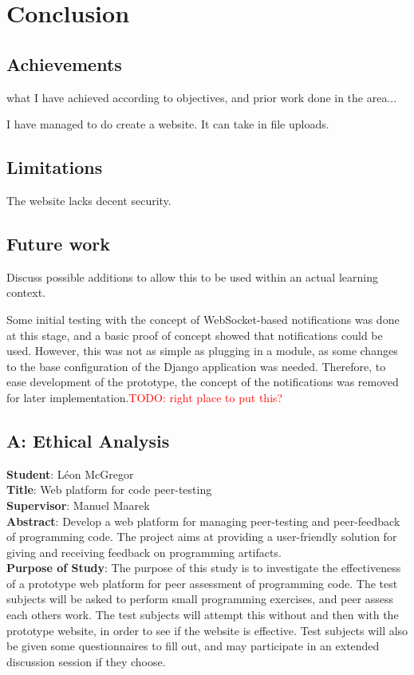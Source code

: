 \documentclass[a4paper,11pt]{report}
\newcommand{\todo}[1]{\textcolor{red}{TODO: #1}}
\begin{document}
\chapter{Conclusion}
\section{Achievements}
what I have achieved according to objectives, and prior work done in the area...\par
I have managed to do create a website. It can take in file uploads.
\section{Limitations}
The website lacks decent security.
\section{Future work}
Discuss possible additions to allow this to be used within an actual learning context.\par
Some initial testing with the concept of WebSocket-based notifications was done at this stage, and a basic proof of concept showed that notifications could be used. However, this was not as simple as plugging in a module, as some changes to the base configuration of the Django application was needed. Therefore, to ease development of the prototype, the concept of the notifications was removed for later implementation.\todo{right place to put this?}\par




\pagebreak
\singlespacing
\printbibliography
{}

\section*{A: Ethical Analysis}
\label{app:ethical}
\textbf{Student}: L\'eon McGregor\\
\textbf{Title}: Web platform for code peer-testing\\
\textbf{Supervisor}: Manuel Maarek\\
\textbf{Abstract}: Develop a web platform for managing peer-testing and peer-feedback of programming code. The project aims at providing a user-friendly solution for giving and receiving feedback on programming artifacts.\\
\textbf{Purpose of Study}: The purpose of this study is to investigate the effectiveness of a prototype web platform for peer assessment of programming code. The test subjects will be asked to perform small programming exercises, and peer assess each others work. The test subjects will attempt this without and then with the prototype website, in order to see if the website is effective. Test subjects will also be given some questionnaires to fill out, and may participate in an extended discussion session if they choose.
\end{document}
